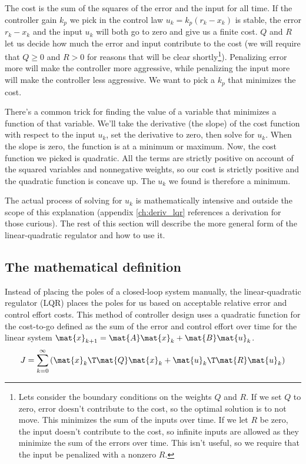 The cost is the sum of the squares of the error and the input for all time. If
the controller gain $k_p$ we pick in the control law $u_k = k_p(r_k - x_k)$ is
stable, the error $r_k - x_k$ and the input $u_k$ will both go to zero and give
us a finite cost. $Q$ and $R$ let us decide how much the error and input
contribute to the cost (we will require that $Q \geq 0$ and $R > 0$ for reasons
that will be clear shortly\footnote{Lets consider the boundary conditions on the
weights $Q$ and $R$. If we set $Q$ to zero, error doesn't contribute to the
cost, so the optimal solution is to not move. This minimizes the sum of the
inputs over time. If we let $R$ be zero, the input doesn't contribute to the
cost, so infinite inputs are allowed as they minimize the sum of the errors over
time. This isn't useful, so we require that the input be penalized with a
nonzero $R$.}). Penalizing error more will make the controller more aggressive,
while penalizing the input more will make the controller less aggressive. We
want to pick a $k_p$ that minimizes the cost.

There's a common trick for finding the value of a variable that minimizes a
function of that variable. We'll take the derivative (the slope) of the cost
function with respect to the input $u_k$, set the derivative to zero, then solve
for $u_k$. When the slope is zero, the function is at a minimum or maximum. Now,
the cost function we picked is quadratic. All the terms are strictly positive on
account of the squared variables and nonnegative weights, so our cost is
strictly positive and the quadratic function is concave up. The $u_k$ we found
is therefore a minimum.

The actual process of solving for $u_k$ is mathematically intensive and outside
the scope of this explanation (appendix \ref{ch:deriv_lqr} references a
derivation for those curious). The rest of this section will describe the more
general form of the linear-quadratic regulator and how to use it.

\subsection{The mathematical definition}

Instead of placing the poles of a closed-loop \gls{system} manually, the
linear-quadratic regulator (LQR) places the poles for us based on acceptable
relative \gls{error} and \gls{control effort} costs. This method of controller
design uses a quadratic function for the cost-to-go defined as the sum of the
\gls{error} and \gls{control effort} over time for the linear \gls{system}
$\mat{x}_{k+1} = \mat{A}\mat{x}_k + \mat{B}\mat{u}_k$.
\begin{equation*}
  J = \sum_{k=0}^\infty \left(\mat{x}_k\T\mat{Q}\mat{x}_k +
    \mat{u}_k\T\mat{R}\mat{u}_k\right)
\end{equation*}

